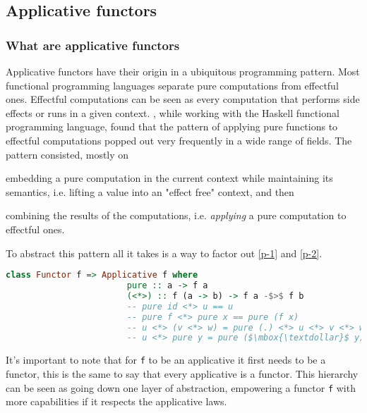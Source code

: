 \documentclass[
  oneside,
  11pt, a4paper,
  footinclude=true,
  headinclude=true,
  cleardoublepage=empty
]{scrbook}
\theoremstyle{definition}
\theoremstyle{definition}
\begin{document}
	    \subsection{Applicative functors}
	    
	        \subsubsection{What are applicative functors}
	        
	            Applicative functors have their origin in a ubiquitous programming pattern. Most functional programming languages separate pure computations from effectful ones. Effectful computations can be seen as every computation that performs side effects or runs in a given context. \cite{mcbride2008applicative}, while working with the Haskell functional programming language, found that the pattern of applying pure functions to effectful computations popped out very frequently in a wide range of fields. The pattern consisted, mostly on
	            \begin{inparaenum}
                  \item embedding a pure computation in the current context while maintaining its semantics, i.e. lifting a value into an "effect free" context,\label{p-1} and then
                  \item combining the results of the computations, i.e. \emph{applying} a pure computation to effectful ones.\label{p-2}
                \end{inparaenum}
	             To abstract this pattern all it takes is a way to factor out \ref{p-1} and \ref{p-2}.
	             
	            \begin{lstlisting}[mathescape, language=Haskell, caption={Applicative laws},captionpos=b]
	                class Functor f => Applicative f where
	                    pure :: a -> f a
	                    (<*>) :: f (a -> b) -> f a -$>$ f b
	                    -- pure id <*> u == u
	                    -- pure f <*> pure x == pure (f x)
	                    -- u <*> (v <*> w) = pure (.) <*> u <*> v <*> w
	                    -- u <*> pure y = pure ($\mbox{\textdollar}$ y) <*> u
	            \end{lstlisting}{}
	            
	            It's important to note that for \texttt{f} to be an applicative it first needs to be a functor, this is the same to say that every applicative is a functor. This hierarchy can be seen as going down one layer of abstraction, empowering a functor \texttt{f} with more capabilities if it respects the applicative laws.
	            
\end{document}
